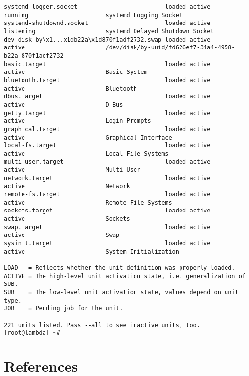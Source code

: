 \documentclass[titlepage]{article}
\begin{document}
\begin{lstlisting}
systemd-logger.socket                         loaded active       running                      systemd Logging Socket
systemd-shutdownd.socket                      loaded active       listening                    systemd Delayed Shutdown Socket
dev-disk-by\x1...x1db22a\x1d870f1adf2732.swap loaded active       active                       /dev/disk/by-uuid/fd626ef7-34a4-4958-b22a-870f1adf2732
basic.target                                  loaded active       active                       Basic System
bluetooth.target                              loaded active       active                       Bluetooth
dbus.target                                   loaded active       active                       D-Bus
getty.target                                  loaded active       active                       Login Prompts
graphical.target                              loaded active       active                       Graphical Interface
local-fs.target                               loaded active       active                       Local File Systems
multi-user.target                             loaded active       active                       Multi-User
network.target                                loaded active       active                       Network
remote-fs.target                              loaded active       active                       Remote File Systems
sockets.target                                loaded active       active                       Sockets
swap.target                                   loaded active       active                       Swap
sysinit.target                                loaded active       active                       System Initialization

LOAD   = Reflects whether the unit definition was properly loaded.
ACTIVE = The high-level unit activation state, i.e. generalization of SUB.
SUB    = The low-level unit activation state, values depend on unit type.
JOB    = Pending job for the unit.

221 units listed. Pass --all to see inactive units, too.
[root@lambda] ~#
\end{lstlisting}
\section{References}
\nocite{*}


\end{document}
